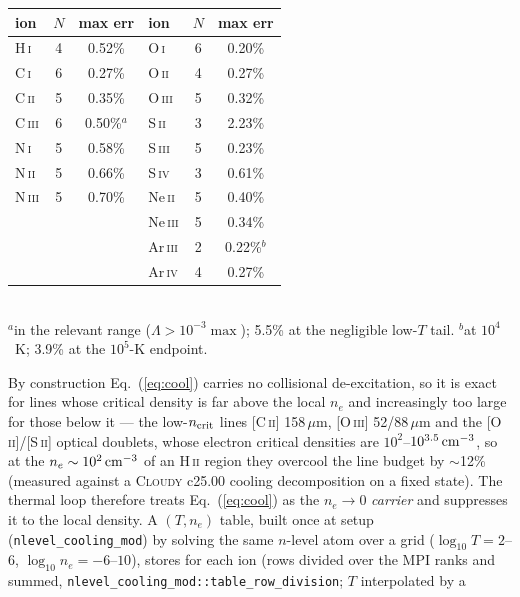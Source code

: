 \documentclass[english,a4paper]{my_memo}
\newcommand{\code}[1]{\texttt{#1}}
\begin{document}
\begin{center}\small
\begin{tabular}{lcc@{\qquad}lcc}
\toprule
ion & $N$ & max err & ion & $N$ & max err \\
\midrule
H\,\textsc{i}   & 4 & 0.52\% & O\,\textsc{i}    & 6 & 0.20\% \\
C\,\textsc{i}   & 6 & 0.27\% & O\,\textsc{ii}   & 4 & 0.27\% \\
C\,\textsc{ii}  & 5 & 0.35\% & O\,\textsc{iii}  & 5 & 0.32\% \\
C\,\textsc{iii} & 6 & 0.50\%$^{a}$ & S\,\textsc{ii} & 3 & 2.23\% \\
N\,\textsc{i}   & 5 & 0.58\% & S\,\textsc{iii}  & 5 & 0.23\% \\
N\,\textsc{ii}  & 5 & 0.66\% & S\,\textsc{iv}   & 3 & 0.61\% \\
N\,\textsc{iii} & 5 & 0.70\% & Ne\,\textsc{ii}  & 5 & 0.40\% \\
 & & & Ne\,\textsc{iii} & 5 & 0.34\% \\
 & & & Ar\,\textsc{iii} & 2 & 0.22\%$^{b}$ \\
 & & & Ar\,\textsc{iv}  & 4 & 0.27\% \\
\bottomrule
\end{tabular}\\[2pt]
{\footnotesize $^a$in the relevant range ($\Lambda > 10^{-3}\max$);
5.5\% at the negligible low-$T$ tail.
$^b$at $10^4$~K; 3.9\% at the $10^5$-K endpoint.}
\end{center}
By construction Eq.~(\ref{eq:cool}) carries no collisional de-excitation,
so it is exact for lines whose critical density is far above the local
$n_e$ and increasingly too large for those below it --- the
low-$n_{\rm crit}$ lines [C\,\textsc{ii}] 158\,$\mu$m,
[O\,\textsc{iii}] 52/88\,$\mu$m and the [O\,\textsc{ii}]/[S\,\textsc{ii}]
optical doublets, whose electron critical densities are
$10^2$--$10^{3.5}\,{\rm cm^{-3}}$, so at the $n_e\sim10^2\,{\rm cm^{-3}}$
of an H\,\textsc{ii} region they overcool the line budget by $\sim$12\%
(measured against a \textsc{Cloudy} c25.00 cooling decomposition on a
fixed state).  The thermal loop therefore treats
Eq.~(\ref{eq:cool}) as the $n_e\rightarrow0$ \emph{carrier} and
suppresses it to the local density.  A $(T, n_e)$ table, built once at
setup (\code{nlevel\_cooling\_mod}) by solving the same $n$-level atom
over a grid ($\log_{10}T = 2$--$6$, $\log_{10}n_e = -6$--$10$), stores
for each ion (rows divided over the MPI ranks and summed,
\code{nlevel\_cooling\_mod::table\_row\_division}; $T$ interpolated by a
\end{document}
